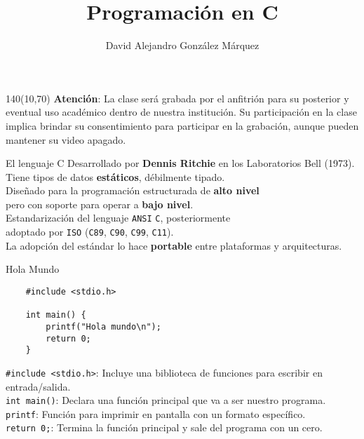 \documentclass[aspectratio=169]{beamer}
\title{\Huge Programación en C}
\author{David Alejandro González Márquez}
\date{}
\begin{document}
\begin{frame}[plain]
    \titlepage
    \begin{textblock}{140}(10,70)
    \textcolor{rojo}{
    \textbf{Atención}: La clase será grabada por el anfitrión para su posterior y eventual uso académico dentro de nuestra institución. Su participación en la clase implica brindar su consentimiento para participar en la grabación, aunque pueden mantener su video apagado.}
    \end{textblock}
\end{frame}


\begin{frame}[fragile]{El lenguaje C}
    Desarrollado por \textbf{Dennis Ritchie} en los Laboratorios Bell (1973).\\
    \bigskip
    Tiene tipos de datos \textbf{estáticos}, débilmente tipado.\\
    \bigskip
    Diseñado para la programación estructurada de \textbf{alto nivel}\\
    pero con soporte para operar a \textbf{bajo nivel}.\\
    \pause
    \bigskip
    Estandarización del lenguaje \texttt{ANSI} \texttt{C}, posteriormente\\
    adoptado por \texttt{ISO} (\texttt{C89}, \texttt{C90}, \texttt{C99}, \texttt{C11}).\\
    \bigskip
    La adopción del estándar lo hace \textbf{portable} entre plataformas y arquitecturas.\\
\end{frame}

\begin{frame}[fragile,t]{Hola Mundo}

    \begin{verbatim}
    #include <stdio.h>

    int main() {
        printf("Hola mundo\n");
        return 0;
    }
    \end{verbatim}
    \small
    \pause
    \textcolor{naranjauca}{\texttt{\#include <stdio.h>}}: Incluye una biblioteca de funciones para escribir en entrada/salida.\\
    \bigskip
    \pause
    \textcolor{naranjauca}{\texttt{int main()}}: Declara una función principal que va a ser nuestro programa.\\
    \bigskip
    \pause
    \textcolor{naranjauca}{\texttt{printf}}: Función para imprimir en pantalla con un formato específico.\\
    \bigskip
    \pause
    \textcolor{naranjauca}{\texttt{return 0;}}: Termina la función principal y sale del programa con un cero.\\
\end{frame}
\end{document}

